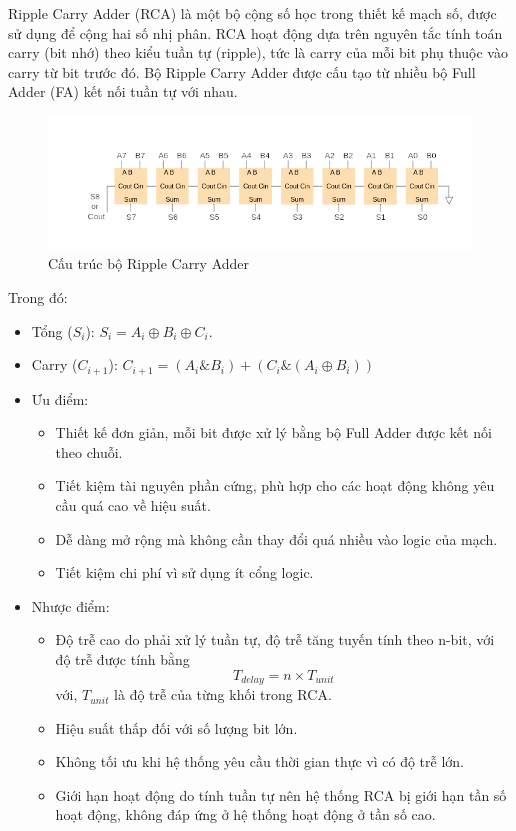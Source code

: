 Ripple Carry Adder (RCA) là một bộ cộng số học trong thiết kế mạch số, được sử dụng để cộng hai số nhị phân. RCA hoạt động dựa trên nguyên tắc tính toán carry (bit nhớ) theo kiểu tuần tự (ripple), tức là carry của mỗi bit phụ thuộc vào carry từ bit trước đó. Bộ Ripple Carry Adder được cấu tạo từ nhiều bộ Full Adder (FA) kết nối tuần tự với nhau.

\begin{figure}[H]
	\centering
	\includegraphics[width = 0.7\linewidth]{./image/ripple_carry_structure.png}
	\caption{Cấu trúc bộ Ripple Carry Adder}
	\label{f_diagam ripple carry adder}
\end{figure}

Trong đó:\\
\begin{itemize}[label = -]
	\item Tổng ($S_{i}$): $S_{i} = A_{i} \oplus B_{i} \oplus C_{i}$.
	\item Carry ($C_{i+1}$): $C_{i+1} = (A_{i} \& B_{i}) + (C_{i} \& (A_{i} \oplus B_{i}))$ 
\end{itemize}

\begin{itemize}[label = -]
	\item Ưu điểm: 
		\begin{itemize}[label = +]
			\item Thiết kế đơn giản, mỗi bit được xử lý bằng bộ Full Adder được kết nối theo chuỗi.
			\item Tiết kiệm tài nguyên phần cứng, phù hợp cho các hoạt động không yêu cầu quá cao về hiệu suất.
			\item Dễ dàng mở rộng mà không cần thay đổi quá nhiều vào logic của mạch.
			\item Tiết kiệm chi phí vì sử dụng ít cổng logic.
		\end{itemize}
	\item Nhược điểm:
		\begin{itemize}[label = +]
			\item Độ trễ cao do phải xử lý tuần tự, độ trễ tăng tuyến tính theo n-bit, với độ trễ được tính bằng \[ T_{delay} = n \times T_{unit} \] với, $T_{unit}$ là độ trễ của từng khối trong RCA.
			\item Hiệu suất thấp đối với số lượng bit lớn.
			\item Không tối ưu khi hệ thống yêu cầu thời gian thực vì có độ trễ lớn.
			\item Giới hạn hoạt động do tính tuần tự nên hệ thống RCA bị giới hạn tần số hoạt động, không đáp ứng ở hệ thống hoạt động ở tần số cao.
		\end{itemize}
\end{itemize}

